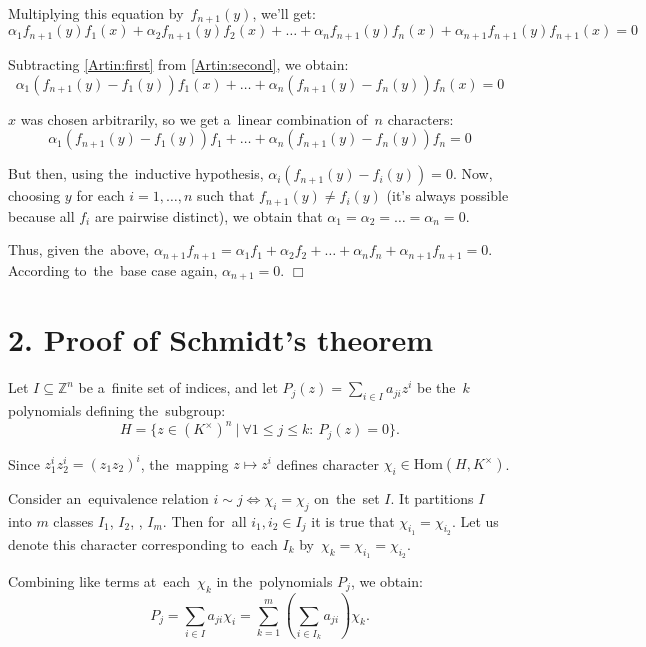 \documentclass[twoside]{article}
\begin{document}
    Multiplying this equation by~$f_{n + 1}(y)$, we'll get:
    \begin{equation}\label{Artin:second}
        \alpha_1 f_{n + 1}(y) f_1(x) + \alpha_2 f_{n + 1}(y) f_2(x) + \ldots + \alpha_n f_{n + 1}(y) f_n(x) + \alpha_{n + 1} f_{n + 1}(y) f_{n + 1}(x) = 0
    \end{equation}

    Subtracting \eqref{Artin:first} from \eqref{Artin:second}, we obtain:
    $$
        \alpha_1 (f_{n + 1}(y) - f_1(y)) f_1(x) + \ldots + \alpha_n (f_{n + 1}(y) - f_n(y)) f_n(x) = 0
    $$

    $x$ was chosen arbitrarily, so we get a~linear combination of~$n$ characters:
    $$
        \alpha_1 (f_{n + 1}(y) - f_1(y)) f_1 + \ldots + \alpha_n (f_{n + 1}(y) - f_n(y)) f_n = 0
    $$

    But then, using the~inductive hypothesis, $\alpha_i (f_{n + 1}(y) - f_i(y)) = 0$. Now, choosing $y$
    for each $i = 1, \ldots, n$ such that $f_{n + 1}(y) \neq f_i(y)$ (it's always possible because all $f_i$
    are pairwise distinct), we obtain that $\alpha_1 = \alpha_2 = \ldots = \alpha_n = 0$.

    Thus, given the~above, $\alpha_{n + 1} f_{n + 1} = \alpha_1 f_1 + \alpha_2 f_2 + \ldots + \alpha_n f_n + \alpha_{n + 1} f_{n + 1} = 0$.
    According to~the~base case again, $\alpha_{n + 1} = 0$.
\hfill$\Box$

\section*{2. Proof of Schmidt's theorem}

    Let $I \subseteq \mathbb{Z}^n$ be a~finite set of indices, and let $P_j(z) = \sum_{i \in I} a_{ji} z^i$ be the~$k$ polynomials
    defining the~subgroup:
    $$
        H = \{ z \in (K^{\times})^n\ |\ \forall 1 \leq j \leq k{:}\ P_j(z) = 0 \}.
    $$

    Since $z_1^{i} z_2^{i} = (z_1 z_2)^i$, the~mapping $z \mapsto z^i$ defines character $\chi_i \in \mathrm{Hom}(H, K^{\times})$.

    Consider an~equivalence relation $i \sim j \Leftrightarrow \chi_i = \chi_j$ on~the~set $I$. It partitions $I$
    into $m$ classes $I_1$, $I_2$, \textellipsis, $I_m$. Then for~all $i_1, i_2 \in I_j$ it is true that $\chi_{i_1} = \chi_{i_2}$.
    Let us denote this character corresponding to~each $I_k$ by~$\chi_k = \chi_{i_1} = \chi_{i_2}$.

    Combining like terms at~each~$\chi_k$ in the~polynomials $P_j$, we obtain:
    $$
        P_j = \sum_{i \in I} a_{ji} \chi_i = \sum_{k = 1}^{m} \left( \sum_{i \in I_k} a_{ji} \right) \chi_k.
    $$
\end{document}
